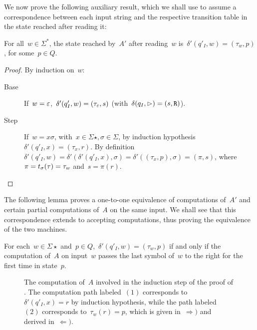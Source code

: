 We now prove the following auxiliary result, which we shall use to assume a correspondence between each input string and the respective transition table in the state reached after reading it:
\begin{lemm}
	For all~$w \in \Sigma^*$, the state reached by~$A'$ after reading~$w$ is~$\delta'(q'_I,w) = (\tau_w,p)$, for some~$p\in Q$.
\end{lemm}
\begin{proof}
	By induction on~$w$:
	\begin{description}
		\item[Base] If~$w=\varepsilon$,~$\delta'(q'_I,w)=(\tau_\varepsilon,s)$ (with~$\delta(q_I,\rhd)=(s,\mathtt R)$).
		\item[Step] If~$w=x\sigma$, with~$x\in\Sigma\star,\sigma\in\Sigma$, by induction hypothesis~$\delta'(q'_I,x)=(\tau_x,r)$.
		      By definition~$\delta'(q'_I,w)=\delta'(\delta'(q'_I,x),\sigma)=\delta'((\tau_x,p),\sigma)=(\pi,s)$, where~$\pi=t_\sigma(\tau)=\tau_w$ and~$s=\pi(r)$. \qedhere
	\end{description}
\end{proof}

The following lemma proves a one-to-one equivalence of computations of~$A'$ and certain partial computations of~$A$ on the same input. We shall see that this correspondence extends to accepting computations, thus proving the equivalence of the two machines.
\begin{lemm}\label{lem:transtab2DFA}
	For each~$w\in\Sigma\star$ and~$p\in Q$,~$\delta'(q'_I,w)=(\tau_w,p)$ if and only if the computation of~$A$ on input~$w$ passes the last symbol of~$w$ to the right for the first time in state~$p$.
\end{lemm}


\begin{figure}
	\centering
	
	\caption[Induction step of the proof of ]{The computation of~$A$ involved in the induction step of the proof of .
		The computation path labeled~$(1)$ corresponds to~$\delta'(q'_I,x)=r$ by induction hypothesis, while the path labeled~$(2)$ corresponds to~$\tau_w(r)=p$, which is given in~$\Rightarrow)$ and derived in~$\Leftarrow)$.}
	\label{fig:transtabproof}
\end{figure}

